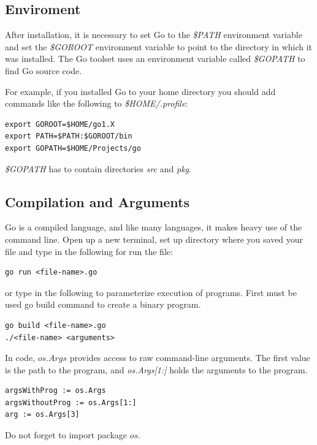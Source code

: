 \documentclass[
  digital, %
  notable,   %
  lof,     %
  lot,     %
]{fithesis3}
\begin{document}
\subsection{Enviroment}
After installation, it is necessary to set Go to the \textit{\$PATH} environment variable and set the \textit{\$GOROOT} environment variable to point to the directory in which it was installed. The Go toolset uses an environment variable called \textit{\$GOPATH} to find Go source code. 

For example, if you installed Go to your home directory you should add commands like the following to \textit{\$HOME/.profile}:
\begin{lstlisting}
export GOROOT=$HOME/go1.X
export PATH=$PATH:$GOROOT/bin
export GOPATH=$HOME/Projects/go
\end{lstlisting}
\textit{\$GOPATH} has to contain directories \textit{src} and \textit{pkg}.

\subsection{Compilation and Arguments}
Go is a compiled language, and like many languages, it makes heavy use of the command
line. Open up a new terminal, set up directory where you saved your file and type in the following for run the file:
\begin{lstlisting}
go run <file-name>.go
\end{lstlisting}
or type in the following to parameterize execution of programs. First must be used go build command to create a binary program.
\begin{lstlisting}
go build <file-name>.go
./<file-name> <arguments>
\end{lstlisting}
In code, $os.Args$ provides access to raw command-line arguments. The first value is the path to the program, and \textit{os.Args[1:]} holds the arguments to the program.
\begin{lstlisting}
argsWithProg := os.Args
argsWithoutProg := os.Args[1:]
arg := os.Args[3]
\end{lstlisting}
Do not forget to import package $os$.
\end{document}
